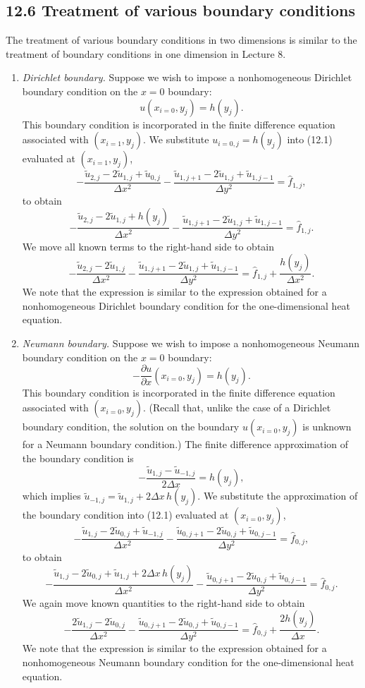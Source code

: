 \subsection{12.6 Treatment of various boundary conditions}
The treatment of various boundary conditions in two dimensions is similar to the treatment of boundary conditions in one dimension in Lecture 8.
\begin{enumerate}
    \item \textit{Dirichlet boundary.} Suppose we wish to impose a nonhomogeneous Dirichlet boundary condition on the $x = 0$ boundary:
    \[u(x_{i=0}, y_j) = h(y_j).\]
    This boundary condition is incorporated in the finite difference equation associated with $(x_{i=1}, y_j)$. We substitute $u_{i=0,j} = h(y_j)$ into (12.1) evaluated at $(x_{i=1}, y_j)$,
    \[-\frac{\tilde{u}_{2,j} - 2\tilde{u}_{1,j} + \tilde{u}_{0,j}}{\Delta x^2} - \frac{\tilde{u}_{1,j+1} - 2\tilde{u}_{1,j} + \tilde{u}_{1,j-1}}{\Delta y^2} = \hat{f}_{1,j},\]
    to obtain
    \[-\frac{\tilde{u}_{2,j} - 2\tilde{u}_{1,j} + h(y_j)}{\Delta x^2} - \frac{\tilde{u}_{1,j+1} - 2\tilde{u}_{1,j} + \tilde{u}_{1,j-1}}{\Delta y^2} = \hat{f}_{1,j}.\]
    We move all known terms to the right-hand side to obtain
    \[-\frac{\tilde{u}_{2,j} - 2\tilde{u}_{1,j}}{\Delta x^2} - \frac{\tilde{u}_{1,j+1} - 2\tilde{u}_{1,j} + \tilde{u}_{1,j-1}}{\Delta y^2} = \hat{f}_{1,j} + \frac{h(y_j)}{\Delta x^2}.\]
    We note that the expression is similar to the expression obtained for a nonhomogeneous Dirichlet boundary condition for the one-dimensional heat equation.
    \item \textit{Neumann boundary.} Suppose we wish to impose a nonhomogeneous Neumann boundary condition on the $x = 0$ boundary:
    \[-\frac{\partial u}{\partial x}(x_{i=0}, y_j) = h(y_j).\]
    This boundary condition is incorporated in the finite difference equation associated with $(x_{i=0}, y_j)$. (Recall that, unlike the case of a Dirichlet boundary condition, the solution on the boundary $u(x_{i=0}, y_j)$ is unknown for a Neumann boundary condition.) The finite difference approximation of the boundary condition is
    \[-\frac{\tilde{u}_{1,j} - \tilde{u}_{-1,j}}{2\Delta x} = h(y_j),\]
    which implies $\tilde{u}_{-1,j} = \tilde{u}_{1,j} + 2\Delta x\,h(y_j)$. We substitute the approximation of the boundary condition into (12.1) evaluated at $(x_{i=0}, y_j)$,
    \[-\frac{\tilde{u}_{1,j} - 2\tilde{u}_{0,j} + \tilde{u}_{-1,j}}{\Delta x^2} - \frac{\tilde{u}_{0,j+1} - 2\tilde{u}_{0,j} + \tilde{u}_{0,j-1}}{\Delta y^2} = \hat{f}_{0,j},\]
    to obtain
    \[-\frac{\tilde{u}_{1,j} - 2\tilde{u}_{0,j} + \tilde{u}_{1,j} + 2\Delta x\,h(y_j)}{\Delta x^2} - \frac{\tilde{u}_{0,j+1} - 2\tilde{u}_{0,j} + \tilde{u}_{0,j-1}}{\Delta y^2} = \hat{f}_{0,j}.\]
    We again move known quantities to the right-hand side to obtain
    \[-\frac{2\tilde{u}_{1,j} - 2\tilde{u}_{0,j}}{\Delta x^2} - \frac{\tilde{u}_{0,j+1} - 2\tilde{u}_{0,j} + \tilde{u}_{0,j-1}}{\Delta y^2} = \hat{f}_{0,j} + \frac{2h(y_j)}{\Delta x}.\]
    We note that the expression is similar to the expression obtained for a nonhomogeneous Neumann boundary condition for the one-dimensional heat equation.
\end{enumerate}

